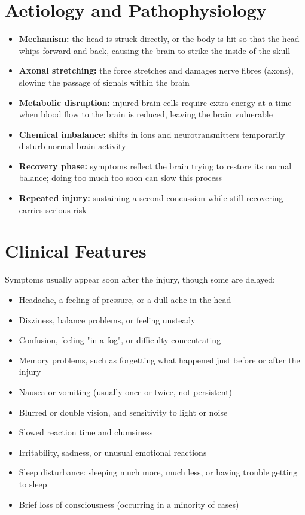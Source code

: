 \section*{Aetiology and Pathophysiology}
\begin{itemize}
    \item \textbf{Mechanism:} the head is struck directly, or the body is hit so that the head whips forward and back, causing the brain to strike the inside of the skull
    \item \textbf{Axonal stretching:} the force stretches and damages nerve fibres (axons), slowing the passage of signals within the brain
    \item \textbf{Metabolic disruption:} injured brain cells require extra energy at a time when blood flow to the brain is reduced, leaving the brain vulnerable
    \item \textbf{Chemical imbalance:} shifts in ions and neurotransmitters temporarily disturb normal brain activity
    \item \textbf{Recovery phase:} symptoms reflect the brain trying to restore its normal balance; doing too much too soon can slow this process
    \item \textbf{Repeated injury:} sustaining a second concussion while still recovering carries serious risk
\end{itemize}

\section*{Clinical Features}
Symptoms usually appear soon after the injury, though some are delayed:

\begin{itemize}
    \item Headache, a feeling of pressure, or a dull ache in the head
    \item Dizziness, balance problems, or feeling unsteady
    \item Confusion, feeling "in a fog", or difficulty concentrating
    \item Memory problems, such as forgetting what happened just before or after the injury
    \item Nausea or vomiting (usually once or twice, not persistent)
    \item Blurred or double vision, and sensitivity to light or noise
    \item Slowed reaction time and clumsiness
    \item Irritability, sadness, or unusual emotional reactions
    \item Sleep disturbance: sleeping much more, much less, or having trouble getting to sleep
    \item Brief loss of consciousness (occurring in a minority of cases)
\end{itemize}


